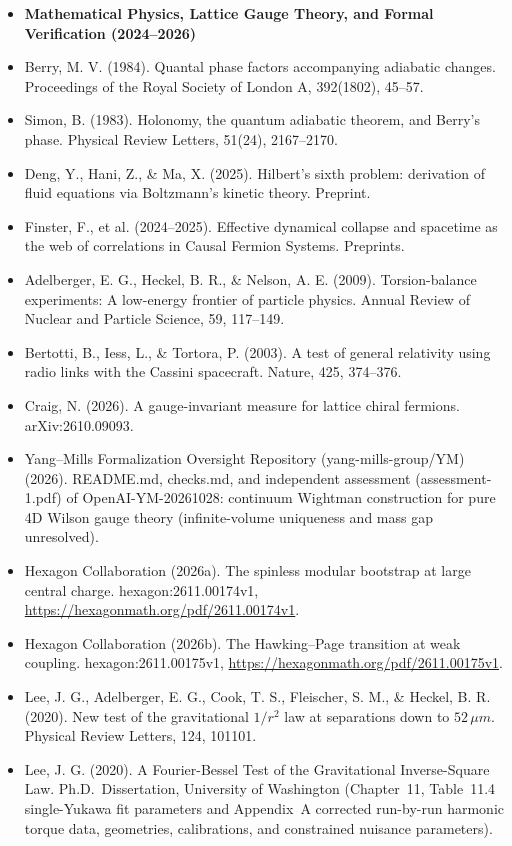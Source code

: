 \documentclass[american,11pt,letterpaper]{article}
\def\mathrm#1{#1}%
\def\texttt#1{#1}%
\def\emph#1{#1}%
\begin{document}
\begin{itemize}
\item[] \textbf{Mathematical Physics, Lattice Gauge Theory, and Formal Verification (2024--2026)}
\item Berry, M. V. (1984). Quantal phase factors accompanying adiabatic changes. \emph{Proceedings of the Royal Society of London A}, 392(1802), 45--57.
\item Simon, B. (1983). Holonomy, the quantum adiabatic theorem, and Berry's phase. \emph{Physical Review Letters}, 51(24), 2167--2170.
\item Deng, Y., Hani, Z., \& Ma, X. (2025). Hilbert's sixth problem: derivation of fluid equations via Boltzmann's kinetic theory. Preprint.
\item Finster, F., et al. (2024--2025). Effective dynamical collapse and spacetime as the web of correlations in Causal Fermion Systems. Preprints.
\item Adelberger, E. G., Heckel, B. R., \& Nelson, A. E. (2009). Torsion-balance experiments: A low-energy frontier of particle physics. \emph{Annual Review of Nuclear and Particle Science}, 59, 117--149.
\item Bertotti, B., Iess, L., \& Tortora, P. (2003). A test of general relativity using radio links with the Cassini spacecraft. \emph{Nature}, 425, 374--376.
\item Craig, N. (2026). A gauge-invariant measure for lattice chiral fermions. \texttt{arXiv:2610.09093}.
\item Yang--Mills Formalization Oversight Repository (\texttt{yang-mills-group/YM}) (2026). \texttt{README.md}, \texttt{checks.md}, and independent assessment (\texttt{assessment-1.pdf}) of \texttt{OpenAI-YM-20261028}: continuum Wightman construction for pure 4D Wilson gauge theory (infinite-volume uniqueness and mass gap unresolved).
\item Hexagon Collaboration (2026a). \emph{The spinless modular bootstrap at large central charge}. \texttt{hexagon:2611.00174v1}, \url{https://hexagonmath.org/pdf/2611.00174v1}.
\item Hexagon Collaboration (2026b). \emph{The Hawking--Page transition at weak coupling}. \texttt{hexagon:2611.00175v1}, \url{https://hexagonmath.org/pdf/2611.00175v1}.
\item Lee, J. G., Adelberger, E. G., Cook, T. S., Fleischer, S. M., \& Heckel, B. R. (2020). New test of the gravitational $1/r^2$ law at separations down to $52\,\mu\mathrm{m}$. \emph{Physical Review Letters}, 124, 101101.
\item Lee, J. G. (2020). \emph{A Fourier-Bessel Test of the Gravitational Inverse-Square Law}. Ph.D.\ Dissertation, University of Washington (Chapter~11, Table~11.4 single-Yukawa fit parameters and Appendix~A corrected run-by-run harmonic torque data, geometries, calibrations, and constrained nuisance parameters).

\end{itemize}
\end{document}
